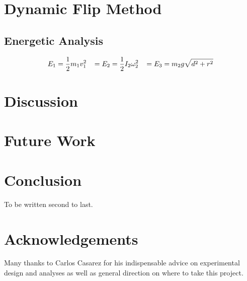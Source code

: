 \documentclass[letterpaper]{report}
\begin{document}
\section{Dynamic Flip Method}
\subsection{Energetic Analysis}

\begin{align}
E_1 = \frac{1}{2} m_1 v_1^2 \hspace{3mm} = E_2 = \frac{1}{2} I_2 \omega_2^2 \hspace{3mm} = E_3 = m_2 g \sqrt{d^2+r^2}
\end{align}

\section{Discussion}

\section{Future Work}


\section{Conclusion}
To be written second to last.

\section{Acknowledgements}
Many thanks to Carlos Casarez for his indispensable advice on experimental design and analyses as well as general direction on where to take this project.



\end{document}
